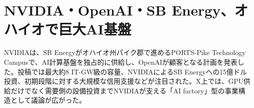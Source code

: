 \section{NVIDIA・OpenAI・SB Energy、オハイオで巨大AI基盤}
NVIDIAは、SB Energyがオハイオ州パイク郡で進めるPORTS-Pike Technology Campusで、AI計算基盤を独占的に供給し、OpenAIが顧客となる計画を発表した。投稿では最大約8 IT-GW級の容量、NVIDIAによるSB Energyへの15億ドル投資、初期段階に対する大規模な信用支援などが注目された。X上では、GPU供給だけでなく需要側の設備投資までNVIDIAが支える「AI factory」型の事業構造として議論が広がった。
